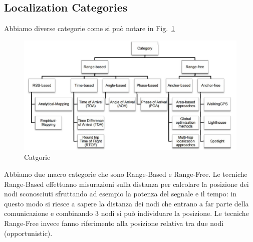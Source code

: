         \subsection{Localization Categories}\label{subsec3.4}
        Abbiamo diverse categorie come si può notare in
Fig.~\ref{fig:fig3-lec3pt1}
        \begin{figure}
                \centering
                \includegraphics[scale=0.6]{fig3-lec3pt1.png}
                \caption{Catgorie}
                \label{fig:fig3-lec3pt1}
        \end{figure}
        Abbiamo due macro categorie che sono Range-Based e Range-Free.
        Le tecniche Range-Based effettuano misurazioni sulla distanza per
calcolare la posizione dei nodi sconosciuti sfruttando ad esempio la potenza del
segnale e il tempo: in questo modo si riesce a sapere la distanza dei nodi che
entrano a far parte della comunicazione e combinando 3 nodi si può individuare
la posizione. Le tecniche Range-Free invece fanno riferimento alla posizione
relativa tra due nodi (opportunistic).
